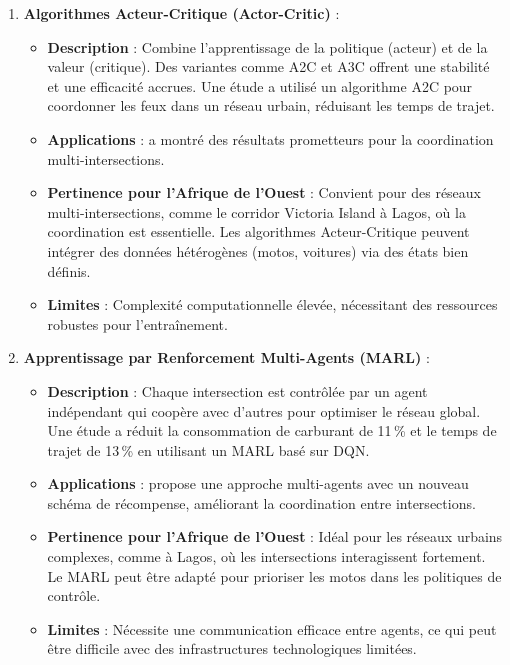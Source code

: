 \begin{enumerate}
    \item \textbf{Algorithmes Acteur-Critique (Actor-Critic)} :  
        \begin{itemize}
            \item \textbf{Description} : Combine l'apprentissage de la politique (acteur) et de la valeur (critique). Des variantes comme A2C et A3C offrent une stabilité et une efficacité accrues. Une étude \cite{cooperative2019traffic} a utilisé un algorithme A2C pour coordonner les feux dans un réseau urbain, réduisant les temps de trajet.
            \item \textbf{Applications} : \cite{cooperative2019traffic} a montré des résultats prometteurs pour la coordination multi-intersections.
            \item \textbf{Pertinence pour l'Afrique de l'Ouest} : Convient pour des réseaux multi-intersections, comme le corridor Victoria Island à Lagos, où la coordination est essentielle. Les algorithmes Acteur-Critique peuvent intégrer des données hétérogènes (motos, voitures) via des états bien définis.
            \item \textbf{Limites} : Complexité computationnelle élevée, nécessitant des ressources robustes pour l'entraînement.
        \end{itemize}

    \item \textbf{Apprentissage par Renforcement Multi-Agents (MARL)} :  
        \begin{itemize}
            \item \textbf{Description} : Chaque intersection est contrôlée par un agent indépendant qui coopère avec d'autres pour optimiser le réseau global. Une étude \cite{multiagent2023reinforcement} a réduit la consommation de carburant de 11\,\% et le temps de trajet de 13\,\% en utilisant un MARL basé sur DQN.
            \item \textbf{Applications} : \cite{multiagent2023reinforcement} propose une approche multi-agents avec un nouveau schéma de récompense, améliorant la coordination entre intersections.
            \item \textbf{Pertinence pour l'Afrique de l'Ouest} : Idéal pour les réseaux urbains complexes, comme à Lagos, où les intersections interagissent fortement. Le MARL peut être adapté pour prioriser les motos dans les politiques de contrôle.
            \item \textbf{Limites} : Nécessite une communication efficace entre agents, ce qui peut être difficile avec des infrastructures technologiques limitées.
        \end{itemize}


\end{enumerate}
